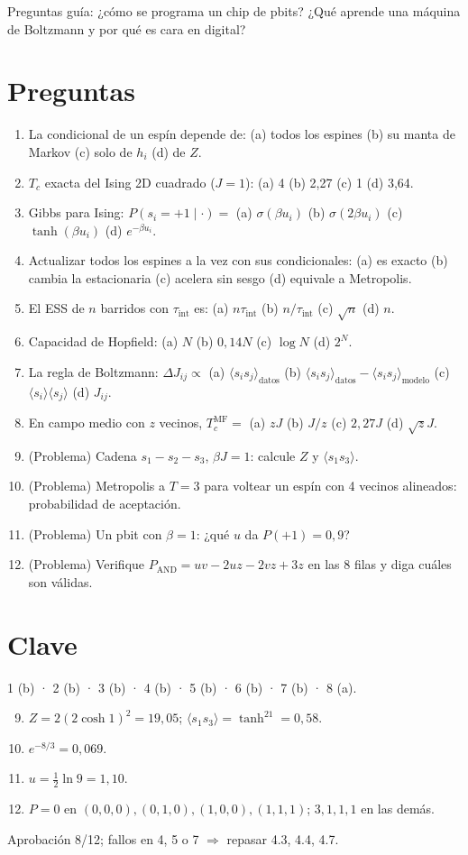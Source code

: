 \documentclass[11pt,a4paper]{article}
\begin{document}
\noindent Preguntas guía: ¿cómo se programa un chip de pbits? ¿Qué aprende una máquina de Boltzmann y por qué es cara en digital?
\section*{Preguntas}
\begin{enumerate}
\item La condicional de un espín depende de: (a) todos los espines (b) su manta de Markov (c) solo de $h_i$ (d) de $Z$.
\item $T_c$ exacta del Ising 2D cuadrado ($J=1$): (a) 4 (b) 2,27 (c) 1 (d) 3,64.
\item Gibbs para Ising: $P(s_i=+1\mid\cdot)=$ (a) $\sigma(\beta u_i)$ (b) $\sigma(2\beta u_i)$ (c) $\tanh(\beta u_i)$ (d) $e^{-\beta u_i}$.
\item Actualizar todos los espines a la vez con sus condicionales: (a) es exacto (b) cambia la estacionaria (c) acelera sin sesgo (d) equivale a Metropolis.
\item El ESS de $n$ barridos con $\tau_{\text{int}}$ es: (a) $n\tau_{\text{int}}$ (b) $n/\tau_{\text{int}}$ (c) $\sqrt n$ (d) $n$.
\item Capacidad de Hopfield: (a) $N$ (b) $0{,}14N$ (c) $\log N$ (d) $2^N$.
\item La regla de Boltzmann: $\Delta J_{ij}\propto$ (a) $\langle s_is_j\rangle_{\text{datos}}$ (b) $\langle s_is_j\rangle_{\text{datos}}-\langle s_is_j\rangle_{\text{modelo}}$ (c) $\langle s_i\rangle\langle s_j\rangle$ (d) $J_{ij}$.
\item En campo medio con $z$ vecinos, $T_c^{\text{MF}}=$ (a) $zJ$ (b) $J/z$ (c) $2,27J$ (d) $\sqrt zJ$.
\item (Problema) Cadena $s_1-s_2-s_3$, $\beta J=1$: calcule $Z$ y $\langle s_1s_3\rangle$.
\item (Problema) Metropolis a $T=3$ para voltear un espín con 4 vecinos alineados: probabilidad de aceptación.
\item (Problema) Un pbit con $\beta=1$: ¿qué $u$ da $P(+1)=0{,}9$?
\item (Problema) Verifique $P_{\text{AND}}=uv-2uz-2vz+3z$ en las 8 filas y diga cuáles son válidas.
\end{enumerate}
\newpage
\section*{Clave}
1 (b) · 2 (b) · 3 (b) · 4 (b) · 5 (b) · 6 (b) · 7 (b) · 8 (a).
\begin{enumerate}\setcounter{enumi}{8}
\item $Z=2(2\cosh1)^2=19{,}05$; $\langle s_1s_3\rangle=\tanh^21=0{,}58$.
\item $e^{-8/3}=0{,}069$.
\item $u=\tfrac12\ln9=1{,}10$.
\item $P=0$ en $(0,0,0),(0,1,0),(1,0,0),(1,1,1)$; $3,1,1,1$ en las demás.
\end{enumerate}
Aprobación 8/12; fallos en 4, 5 o 7 $\Rightarrow$ repasar 4.3, 4.4, 4.7.
\end{document}
